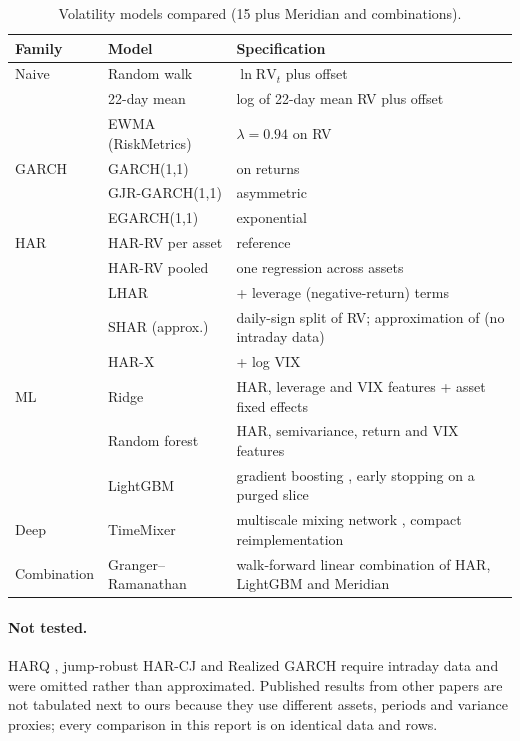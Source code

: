 \documentclass[11pt,a4paper]{article}
\begin{document}
\begin{table}[!htbp]
\centering\small
\caption{Volatility models compared (15 plus Meridian and combinations).}\label{tab:volmodels}
\begin{tabularx}{\linewidth}{l l X}
\toprule
\textbf{Family} & \textbf{Model} & \textbf{Specification} \\
\midrule
Naive & Random walk & $\ln\mathrm{RV}_t$ plus offset \\
 & 22-day mean & log of 22-day mean RV plus offset \\
 & EWMA (RiskMetrics) & $\lambda=0.94$ on RV \cite{riskmetrics1996} \\
GARCH & GARCH(1,1) & on returns \cite{bollerslev1986} \\
 & GJR-GARCH(1,1) & asymmetric \cite{gjr1993} \\
 & EGARCH(1,1) & exponential \cite{nelson1991} \\
HAR & HAR-RV per asset & reference \cite{corsi2009} \\
 & HAR-RV pooled & one regression across assets \\
 & LHAR & + leverage (negative-return) terms \cite{corsireno2012} \\
 & SHAR (approx.) & daily-sign split of RV; approximation of \cite{pattonsheppard2015} (no intraday data) \\
 & HAR-X & + log VIX \\
ML & Ridge & HAR, leverage and VIX features + asset fixed effects \\
 & Random forest & HAR, semivariance, return and VIX features \\
 & LightGBM & gradient boosting \cite{ke2017lightgbm}, early stopping on a purged slice \\
Deep & TimeMixer & multiscale mixing network \cite{wang2024timemixer}, compact reimplementation \\
Combination & Granger--Ramanathan & walk-forward linear combination of HAR, LightGBM and Meridian \cite{grangerramanathan1984} \\
\bottomrule
\end{tabularx}
\end{table}

\paragraph{Not tested.} HARQ \cite{bollerslev2016harq}, jump-robust HAR-CJ \cite{abd2007} and Realized
GARCH \cite{hansen2012realizedgarch} require intraday data and were omitted rather than approximated.
Published results from other papers are not tabulated next to ours because they use different assets,
periods and variance proxies; every comparison in this report is on identical data and rows.
\end{document}
